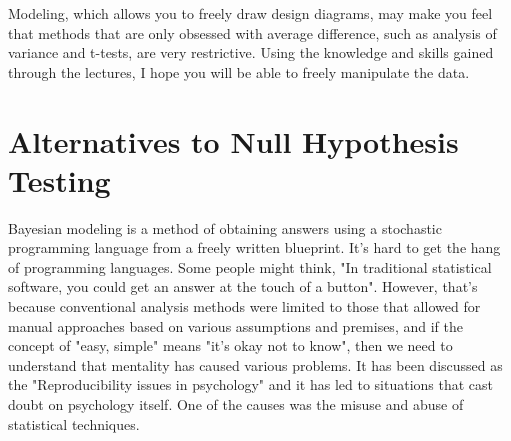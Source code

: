 \documentclass{ltjsbook}
\begin{document}
Modeling, which allows you to freely draw design diagrams, may make you feel that methods that are only obsessed with average difference, such as analysis of variance and t-tests, are very restrictive. Using the knowledge and skills gained through the lectures, I hope you will be able to freely manipulate the data.

\section{Alternatives to Null Hypothesis Testing}
Bayesian modeling is a method of obtaining answers using a stochastic programming language from a freely written blueprint. It's hard to get the hang of programming languages. Some people might think, "In traditional statistical software, you could get an answer at the touch of a button". However, that's because conventional analysis methods were limited to those that allowed for manual approaches based on various assumptions and premises, and if the concept of "easy, simple" means "it's okay not to know", then we need to understand that mentality has caused various problems. It has been discussed as the "Reproducibility issues in psychology" and it has led to situations that cast doubt on psychology itself. One of the causes was the misuse and abuse of statistical techniques.
\end{document}
